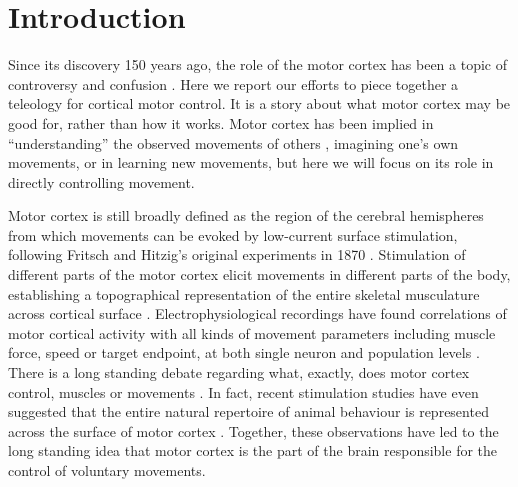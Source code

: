 \section{Introduction}

Since its discovery 150 years ago, the role of the motor cortex has been a topic of controversy and confusion \cite{Lashley1924}. Here we report our efforts to piece together a teleology for cortical motor control. It is a story about what motor cortex may be good for, rather than how it works. Motor cortex has been implied in ``understanding'' the observed movements of others \cite{Rizzolatti2004}, imagining one's own movements, or in learning new movements, but here we will focus on its role in directly controlling movement.

Motor cortex is still broadly defined as the region of the cerebral hemispheres from which movements can be evoked by low-current surface stimulation, following Fritsch and Hitzig's original experiments in 1870 \cite{Fritsch1870}. Stimulation of different parts of the motor cortex elicit movements in different parts of the body, establishing a topographical representation of the entire skeletal musculature across cortical surface \cite{Leyton1917,Penfield1937,Neafsey1986}. Electrophysiological recordings have found correlations of motor cortical activity with all kinds of movement parameters including muscle force, speed or target endpoint, at both single neuron and population levels \cite{Georgopoulos1986}. There is a long standing debate regarding what, exactly, does motor cortex control, muscles or movements \cite{Todorov2000}. In fact, recent stimulation studies have even suggested that the entire natural repertoire of animal behaviour is represented across the surface of motor cortex \cite{Graziano2002,Aflalo2006}. Together, these observations have led to the long standing idea that motor cortex is the part of the brain responsible for the control of voluntary movements.

